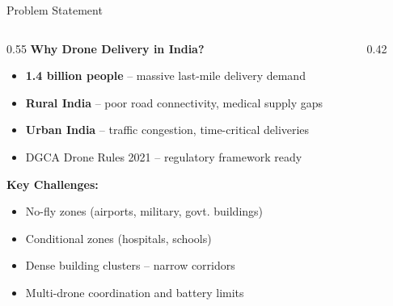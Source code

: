 \documentclass[aspectratio=169, 11pt]{beamer}
\begin{document}
\begin{frame}{Problem Statement}
\begin{columns}[T]
\begin{column}{0.55\textwidth}
\textcolor{neongreen}{\textbf{Why Drone Delivery in India?}}\\[0.3cm]
\begin{itemize}
    \item[\textcolor{neongreen}{$\bullet$}] \textbf{1.4 billion people} -- massive last-mile delivery demand
    \item[\textcolor{neongreen}{$\bullet$}] \textbf{Rural India} -- poor road connectivity, medical supply gaps
    \item[\textcolor{neongreen}{$\bullet$}] \textbf{Urban India} -- traffic congestion, time-critical deliveries
    \item[\textcolor{neongreen}{$\bullet$}] DGCA Drone Rules 2021 -- regulatory framework ready
\end{itemize}
\vspace{0.4cm}
\textcolor{dangerred}{\textbf{Key Challenges:}}
\begin{itemize}
    \item[\textcolor{dangerred}{$\bullet$}] No-fly zones (airports, military, govt. buildings)
    \item[\textcolor{warnorange}{$\bullet$}] Conditional zones (hospitals, schools)
    \item[\textcolor{accentblue}{$\bullet$}] Dense building clusters -- narrow corridors
    \item[\textcolor{accentblue}{$\bullet$}] Multi-drone coordination and battery limits
\end{itemize}
\end{column}
\begin{column}{0.42\textwidth}
\end{column}
\end{columns}
\end{frame}
\end{document}
